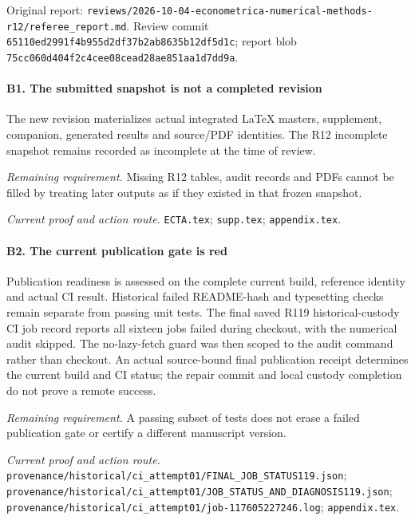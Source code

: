 Original report: \nolinkurl{reviews/2026-10-04-econometrica-numerical-methods-r12/referee_report.md}. Review commit \nolinkurl{65110ed2991f4b955d2df37b2ab8635b12df5d1c}; report blob \nolinkurl{75cc060d404f2c4cee08cead28ae851aa1d7dd9a}.

\paragraph{B1. The submitted snapshot is not a completed revision}

The new revision materializes actual integrated LaTeX masters, supplement, companion, generated results and source/\allowbreak{}PDF identities. The R12 incomplete snapshot remains recorded as incomplete at the time of review.

\par\emph{Remaining requirement.} Missing R12 tables, audit records and PDFs cannot be filled by treating later outputs as if they existed in that frozen snapshot.

\par\emph{Current proof and action route.} \nolinkurl{ECTA.tex}; \nolinkurl{supp.tex}; \nolinkurl{appendix.tex}.

\paragraph{B2. The current publication gate is red}

Publication readiness is assessed on the complete current build, reference identity and actual CI result. Historical failed README-hash and typesetting checks remain separate from passing unit tests. The final saved R119 historical-custody CI job record reports all sixteen jobs failed during checkout, with the numerical audit skipped. The no-lazy-fetch guard was then scoped to the audit command rather than checkout. An actual source-bound final publication receipt determines the current build and CI status; the repair commit and local custody completion do not prove a remote success.

\par\emph{Remaining requirement.} A passing subset of tests does not erase a failed publication gate or certify a different manuscript version.

\par\emph{Current proof and action route.} \nolinkurl{provenance/historical/ci_attempt01/FINAL_JOB_STATUS119.json}; \nolinkurl{provenance/historical/ci_attempt01/JOB_STATUS_AND_DIAGNOSIS119.json}; \nolinkurl{provenance/historical/ci_attempt01/job-117605227246.log}; \nolinkurl{appendix.tex}.

